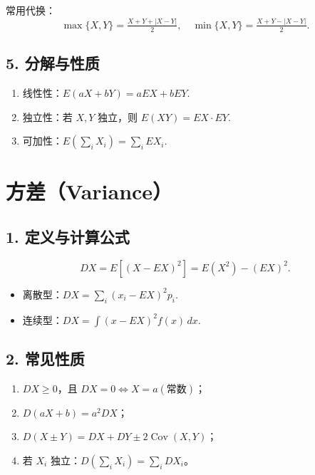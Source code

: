 常用代换：
$$
      \max\{X,Y\}=\tfrac{X+Y+|X-Y|}{2},\quad
      \min\{X,Y\}=\tfrac{X+Y-|X-Y|}{2}.
$$

\subsection*{5. 分解与性质}
\begin{enumerate}
      \item 线性性：$E(aX+bY)=aEX+bEY$.
      \item 独立性：若 $X,Y$ 独立，则 $E(XY)=EX\cdot EY$.
      \item 可加性：$E\!\left(\sum_i X_i\right)=\sum_i EX_i$.
\end{enumerate}


\section{方差（Variance）}

\subsection*{1. 定义与计算公式}
$$DX=E[(X-EX)^2]=E(X^2)-(EX)^2.$$

\begin{itemize}
      \item 离散型：$DX=\sum_i (x_i-EX)^2p_i.$
      \item 连续型：$DX=\int (x-EX)^2f(x)\,dx.$
\end{itemize}

\subsection*{2. 常见性质}
\begin{enumerate}
      \item $DX\ge0$，且 $DX=0\Leftrightarrow X=a(常数)$；
      \item $D(aX+b)=a^2DX$；
      \item $D(X\pm Y)=DX+DY\pm2\operatorname{Cov}(X,Y)$；
      \item 若 $X_i$ 独立：$D\!\left(\sum_i X_i\right)=\sum_i DX_i$。
\end{enumerate}

